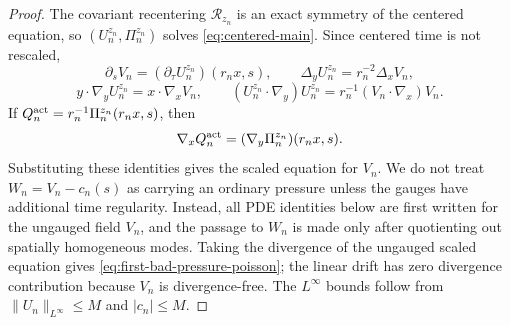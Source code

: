 \documentclass[11pt]{amsart}
\numberwithin{equation}{section}
\theoremstyle{plain}
\theoremstyle{definition}
\theoremstyle{remark}
\newcommand{\calR}{\mathcal R}
\begin{document}
\begin{proof}
The covariant recentering \(\calR_{z_n}\) is an exact symmetry of the centered
equation, so \((U_n^{z_n},\Pi_n^{z_n})\) solves
\eqref{eq:centered-main}.  Since centered
time is not rescaled,
\[
   \partial_sV_n=(\partial_\tau U_n^{z_n})(r_nx,s),\qquad
   \Delta_yU_n^{z_n}=r_n^{-2}\Delta_xV_n,
\]
\[
   y\cdot\nabla_yU_n^{z_n}=x\cdot\nabla_xV_n,\qquad
   (U_n^{z_n}\cdot\nabla_y)U_n^{z_n}
   =
   r_n^{-1}(V_n\cdot\nabla_x)V_n .
\]
If \(Q_n^{\rm act}=r_n^{-1}\Pi_n^{z_n}(r_nx,s)\), then
\[
   \nabla_xQ_n^{\rm act}=(\nabla_y\Pi_n^{z_n})(r_nx,s).
\]
Substituting these identities gives the scaled equation for \(V_n\).  We do not
treat \(W_n=V_n-c_n(s)\) as carrying an ordinary pressure unless the gauges have
additional time regularity.  Instead, all PDE identities below are first written
for the ungauged field \(V_n\), and the passage to \(W_n\) is made only after
quotienting out spatially homogeneous modes.  Taking the divergence
of the ungauged scaled equation gives
\eqref{eq:first-bad-pressure-poisson}; the linear drift has zero divergence
contribution because \(V_n\) is divergence-free.  The \(L^\infty\) bounds follow
from \(\|U_n\|_{L^\infty}\le M\) and \(|c_n|\le M\).
\end{proof}
\end{document}
